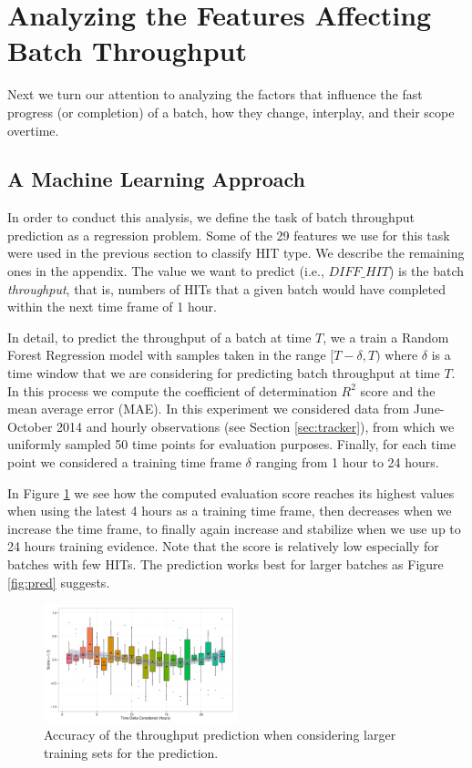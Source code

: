 \section{Analyzing the Features Affecting Batch Throughput}\label{sec:throughput}
Next we turn our attention to analyzing the factors that influence the fast progress (or completion) of a batch, how they change, interplay, and their scope overtime.
\subsection{A Machine Learning Approach}
In order to conduct this analysis, we define the task of batch throughput prediction as a regression problem.  Some of the   29  features we use for this task were used in the previous section to classify HIT type.  We describe the remaining ones in the appendix. The value  we want to predict (i.e.,   $DIFF\_HIT$) is the batch \emph{throughput}, that is, numbers of HITs that  a given batch would have completed within the next time frame of 1 hour.

In detail, to predict the throughput of a batch at time $T$, we a train a Random Forest Regression model with samples taken in the range $[T-\delta, T)$ where $\delta$ is a time window that we are   considering  for predicting batch throughput at time $T$. In this process we compute the coefficient of determination  $R^2$ score \cite{sklearn} and the mean average error (MAE).
In this experiment we considered  data from June-October 2014 and hourly observations (see Section \ref{sec:tracker}), from which we uniformly sampled 50 time points for evaluation purposes. Finally, for each time point we considered a training time frame $\delta$ ranging from 1 hour to 24 hours. 

In Figure \ref{fig:accuracy} we see how the computed evaluation score reaches its highest values when using the latest 4 hours as a training time frame, then decreases when we increase the time frame, to finally again increase and stabilize when we use up to 24 hours training evidence.
Note that the score is relatively low especially for batches with few HITs. The prediction works best for larger batches as Figure \ref{fig:pred} suggests.

\begin{figure}[ht]
	\centering
		\includegraphics[width=0.5\textwidth]{figures/ML_accuracy}
	\caption{Accuracy of the throughput prediction when considering larger training sets for the prediction.}
	\label{fig:accuracy}
\end{figure}

